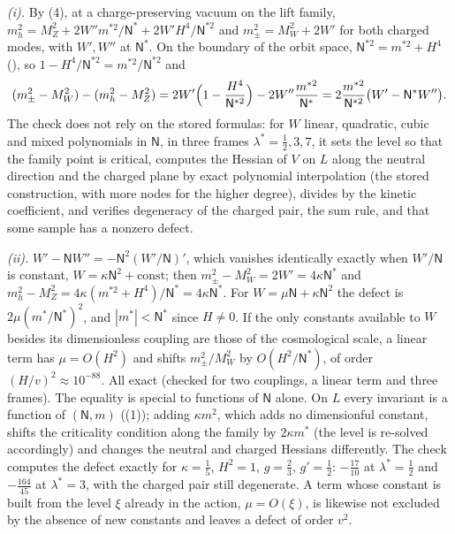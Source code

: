 \emph{(i).} By (4), at a charge-preserving vacuum on the lift family, $m_{h}^{2} = M_{Z}^{2} + 2W''m^{*2}/\mathsf{N}^{*} + 2W'H^{4}/\mathsf{N}^{*2}$ and $m_{\pm}^{2} = M_{W}^{2} + 2W'$ for both charged modes, with $W', W''$ at $\mathsf{N}^{*}$. On the boundary of the orbit space, $\mathsf{N}^{*2} = m^{*2} + H^{4}$ (), so $1 - H^{4}/\mathsf{N}^{*2} = m^{*2}/\mathsf{N}^{*2}$ and
\[
(m_{\pm}^{2} - M_{W}^{2}) - (m_{h}^{2} - M_{Z}^{2}) = 2W'\Bigl(1 - \frac{H^{4}}{\mathsf{N}^{*2}}\Bigr) - 2W''\frac{m^{*2}}{\mathsf{N}^{*}} = 2\frac{m^{*2}}{\mathsf{N}^{*2}}\bigl(W' - \mathsf{N}^{*}W''\bigr).
\]
The check does not rely on the stored formulas: for $W$ linear, quadratic, cubic and mixed polynomials in $\mathsf{N}$, in three frames $\lambda^{*} = \tfrac12, 3, 7$, it sets the level so that the family point is critical, computes the Hessian of $V$ on $L$ along the neutral direction and the charged plane by exact polynomial interpolation (the stored construction, with more nodes for the higher degree), divides by the kinetic coefficient, and verifies degeneracy of the charged pair, the sum rule, and that some sample has a nonzero defect.

\emph{(ii).} $W' - \mathsf{N}W'' = -\mathsf{N}^{2}(W'/\mathsf{N})'$, which vanishes identically exactly when $W'/\mathsf{N}$ is constant, $W = \kappa \mathsf{N}^{2} + \text{const}$; then $m_{\pm}^{2} - M_{W}^{2} = 2W' = 4\kappa \mathsf{N}^{*}$ and $m_{h}^{2} - M_{Z}^{2} = 4\kappa(m^{*2} + H^{4})/\mathsf{N}^{*} = 4\kappa \mathsf{N}^{*}$. For $W = \mu \mathsf{N} + \kappa \mathsf{N}^{2}$ the defect is $2\mu(m^{*}/\mathsf{N}^{*})^{2}$, and $|m^{*}| < \mathsf{N}^{*}$ since $H \neq 0$. If the only constants available to $W$ besides its dimensionless coupling are those of the cosmological scale, a linear term has $\mu = O(H^{2})$ and shifts $m_{\pm}^{2}/M_{W}^{2}$ by $O(H^{2}/\mathsf{N}^{*})$, of order $(H/v)^{2} \approx 10^{-88}$. All exact (checked for two couplings, a linear term and three frames). The equality is special to functions of $\mathsf{N}$ alone. On $L$ every invariant is a function of $(\mathsf{N}, m)$ ((1)); adding $\kappa m^{2}$, which adds no dimensionful constant, shifts the criticality condition along the family by $2\kappa m^{*}$ (the level is re-solved accordingly) and changes the neutral and charged Hessians differently. The check computes the defect exactly for $\kappa = \tfrac15$, $H^{2} = 1$, $g = \tfrac23$, $g' = \tfrac12$: $-\tfrac{17}{10}$ at $\lambda^{*} = \tfrac12$ and $-\tfrac{164}{45}$ at $\lambda^{*} = 3$, with the charged pair still degenerate. A term whose constant is built from the level $\xi$ already in the action, $\mu = O(\xi)$, is likewise not excluded by the absence of new constants and leaves a defect of order $v^{2}$.

